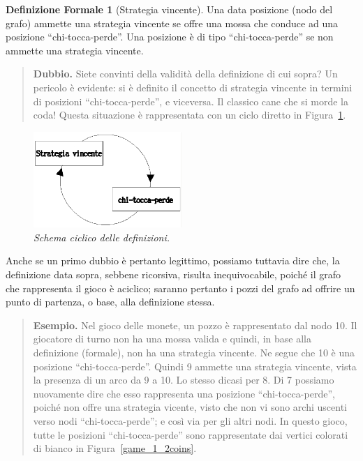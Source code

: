 \documentclass[a4paper, 10pt]{report}
\newenvironment{esempio}{\begin{quote}\textbf{Esempio.} }{\end{quote}}
\newenvironment{dubbio}{\begin{quote}\textbf{Dubbio.} }{\end{quote}}
\theoremstyle{definition} %
\newtheorem*{definizioneFormale}{Definizione Formale}
\begin{document}
\begin{definizioneFormale}[Strategia vincente]
Una data posizione (nodo del grafo) ammette una strategia vincente se offre
una mossa che conduce ad una posizione ``chi-tocca-perde''. Una posizione \`e
di tipo ``chi-tocca-perde'' se non ammette una strategia vincente.
\end{definizioneFormale}

\begin{dubbio}
Siete convinti della validit\`a della definizione di cui sopra? Un pericolo
\`e evidente: si \`e definito il concetto di strategia vincente in
termini di posizioni ``chi-tocca-perde'', e viceversa. Il classico cane che si
morde la coda! Questa situazione \`e rappresentata con un ciclo diretto in
Figura~\ref{winning_strategy_kicks_back_to_kernel}.
\end{dubbio}

\begin{figure}[h]
  \label{winning_strategy_kicks_back_to_kernel}
  \centerline{
    \includegraphics[width=0.5\textwidth]{figs/winning_strategy_kicks_back_to_kernel.png}
  }
  \caption{\textsl{Schema ciclico delle definizioni.}}
\end{figure}

Anche se un primo dubbio \`e pertanto legittimo, possiamo tuttavia dire che, la
definizione data sopra, sebbene ricorsiva, risulta inequivocabile, poich\'e il
grafo che rappresenta il gioco \`e aciclico; saranno pertanto i pozzi del
grafo ad offrire un punto di partenza, o base, alla definizione stessa.

\begin{esempio}
Nel gioco delle monete, un pozzo \`e rappresentato dal nodo 10. Il
giocatore di turno non ha una mossa valida e quindi, in base alla definizione
(formale), non ha una strategia vincente. Ne segue che 10 \`e una posizione
``chi-tocca-perde''. Quindi 9 ammette una strategia vincente, vista la
presenza di un arco da 9 a 10. Lo stesso dicasi per 8. Di 7 possiamo
nuovamente dire che esso rappresenta una posizione ``chi-tocca-perde'',
poich\'e non offre una strategia vicente, visto che non vi sono archi uscenti
verso nodi ``chi-tocca-perde''; e cos\`i via per gli altri nodi. 
In questo gioco, tutte le posizioni ``chi-tocca-perde'' sono rappresentate dai
vertici colorati di bianco in Figura~\ref{game_1_2coins}.
\end{esempio}
\end{document}
